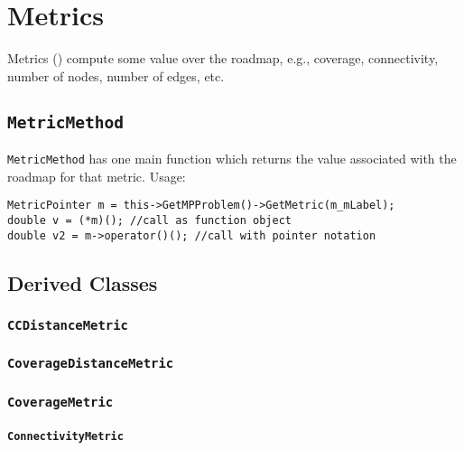 \chapter{Metrics}

Metrics (\metr) compute some value over the roadmap, e.g., coverage,
connectivity, number of nodes, number of edges, etc.

\section{\texttt{MetricMethod}}

\texttt{MetricMethod} has one main function  which returns the
value associated with the roadmap for that metric. Usage:
\begin{lstlisting}
MetricPointer m = this->GetMPProblem()->GetMetric(m_mLabel);
double v = (*m)(); //call as function object
double v2 = m->operator()(); //call with pointer notation
\end{lstlisting}

\section{Derived Classes}

\subsection{\texttt{CCDistanceMetric}}

\subsection{\texttt{CoverageDistanceMetric}}

\subsection{\texttt{CoverageMetric}}

\subsubsection{\texttt{ConnectivityMetric}}

